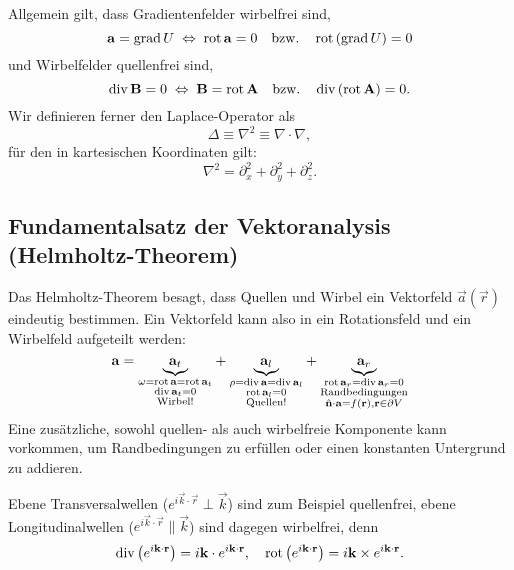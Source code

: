 Allgemein gilt, dass Gradientenfelder wirbelfrei sind,
\begin{equation*}
	\mathbf{a}=\operatorname{grad} U\;\Leftrightarrow\; \operatorname{rot} \mathbf{a}=0\quad\mathrm{bzw.}\quad  \operatorname{rot} \left(\operatorname{grad} U\right)=0
\end{equation*}
und Wirbelfelder quellenfrei sind,
\begin{equation*}
	\operatorname{div} \mathbf{B}=0\;\Leftrightarrow\; \mathbf{B}=\operatorname{rot} \mathbf{A}\quad\mathrm{bzw.}\quad  \operatorname{div} \left(\operatorname{rot} \mathbf{A}\right)=0.
\end{equation*}
Wir definieren ferner den Laplace-Operator als
\begin{equation*}
	\Delta  \equiv \nabla ^{2}\equiv \nabla \cdot \nabla ,
\end{equation*}
für den in kartesischen Koordinaten gilt:
\begin{equation*}
	\nabla ^{2}=\partial _{x}^{2}+\partial _{y}^{2}+\partial _{z}^{2}.
\end{equation*}
\subsection{Fundamentalsatz der Vektoranalysis (Helmholtz-Theorem)\label{ref-009}}

Das Helmholtz-Theorem besagt, dass Quellen und Wirbel ein Vektorfeld $\vec {a}\left(\vec {r}\right)$ eindeutig bestimmen. Ein Vektorfeld kann also in ein Rotationsfeld und ein Wirbelfeld aufgeteilt werden:
\begin{equation*}
	\mathbf{a}=\underset{\substack{
			\omega =\operatorname{rot} \mathbf{a}=\operatorname{rot} \mathbf{a}_{t} \\
			\operatorname{div} \mathbf{a}_{t}=0 \\
			\text{Wirbel}!
		}}{\underbrace{\mathbf{a}_{t}}}+\underset{\substack{
			\rho =\operatorname{div} \mathbf{a}=\operatorname{div} \mathbf{a}_{l} \\
			\operatorname{rot} \mathbf{a}_{l}=0                     \\
			\text{Quellen}!
		}}{\underbrace{\mathbf{a}_{l}}}+\underset{\substack{
			\operatorname{rot} \mathbf{a}_{r}=\operatorname{div} \mathbf{a}_{r}=0 \\
			\text{Randbedingungen}                 \\
			\hat{\mathbf{n }}\cdot \mathbf{a}=f\left(\mathbf{r}\right),\mathbf{r}\in \partial V
		}}{\underbrace{\mathbf{a}_{r}}}
\end{equation*}
Eine zusätzliche, sowohl quellen- als auch wirbelfreie Komponente kann vorkommen, um Randbedingungen zu erfüllen oder einen konstanten Untergrund zu addieren.

Ebene Transversalwellen ($e^{i\vec {k}\cdot \vec {r}}\perp \vec {k}$) sind zum Beispiel quellenfrei, ebene Longitudinalwellen ($e^{i\vec {k}\cdot \vec {r}}\parallel \vec {k}$) sind dagegen wirbelfrei, denn
\begin{equation*}
	\operatorname{div} \left(e^{i\mathbf{k}\cdot \mathbf{r}}\right)=i\mathbf{k}\cdot e^{i\mathbf{k}\cdot \mathbf{r}},\quad \operatorname{rot} \left(e^{i\mathbf{k}\cdot \mathbf{r}}\right)=i\mathbf{k}\times e^{i\mathbf{k}\cdot \mathbf{r}}.
\end{equation*}




